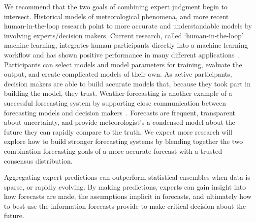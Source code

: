 \documentclass[preprint,authoryear]{elsarticle}
\begin{document}
We recommend that the two goals of combining expert judgment begin to intersect.
Historical models of meteorological phenomena, and more recent human-in-the-loop research point to more accurate and understandable models by involving experts/decision makers.
Current research, called `human-in-the-loop' machine learning, integrates human participants directly into a machine learning workflow and has shown positive performance in many different applications~\cite{cranor2008framework,holzinger2016interactive,yu2015lsun,li2017human}.
Participants can select models and model parameters for training, evaluate the output, and create complicated models of their own.
As active participants, decision makers are able to build accurate models that, because they took part in building the model, they trust.
%
Weather forecasting is another example of a successful forecasting system by supporting close communication between forecasting models and decision makers~\cite{murphy1984probability,murphy1974probability,murphy1974subjective}.
Forecasts are frequent, transparent about uncertainty, and provide meteorologist's a condensed model about the future they can rapidly compare to the truth.
We expect more research will explore how to build stronger forecasting systems by blending together the two combination forecasting goals of a more accurate forecast with a trusted consensus distribution.


Aggregating expert predictions can outperform statistical ensembles when data is sparse, or rapidly evolving.
By making predictions, experts can gain insight into how forecasts are made, the assumptions implicit in forecasts, and ultimately how to best use the information forecasts provide to make critical decision about the future.
\end{document}
